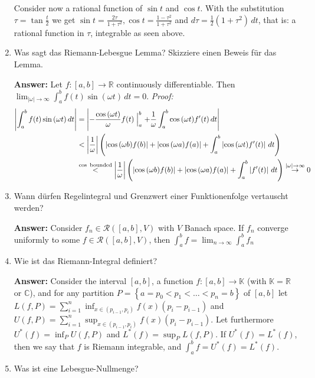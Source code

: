 \documentclass[11pt]{article}
\newcommand{\abs}[1]{\left|#1\right|}
\newcommand{\RR}[0]{\mathbb{R}}
\newcommand{\CC}[0]{\mathbb{C}}
\newcommand{\KK}[0]{\mathbb{K}}
\begin{document}
\begin{enumerate}
    Consider now a rational function of $\sin{t}$ and $\cos{t}$. With the substitution $\tau = \tan{\frac{t}{2}}$ we get $\sin{t} = \frac{2\tau}{1+ \tau^2}, \cos{t} = \frac{1-\tau^2}{1+\tau^2}$ and $d\tau = \frac{1}{2}(1+\tau^2)\,dt$, that is: a rational function in $\tau$, integrable as seen above.

    \item Was sagt das Riemann-Lebesgue Lemma? Skizziere einen Beweis für das Lemma.

    \textbf{Answer:} Let $f\colon [a, b] \to \RR$ continuously differentiable. Then $\lim_{\abs{\omega}\to\infty} \int_a^b f(t) \sin(\omega t) \,dt = 0$.
    \textit{Proof:} $$\begin{aligned}
        \abs{\int_a^b f(t) \sin{(\omega t)}\,dt} &= \abs{-\frac{\cos{(\omega t)}}{\omega}f(t)\Bigm|_a^b + \frac{1}{\omega} \int_a^b \cos{(\omega t)} f^\prime(t)\,dt} \\
        &< \abs{\frac{1}{\omega}} \left(\abs{\cos{(\omega b)} f(b)} + \abs{\cos{(\omega a)} f(a)} + \int_a^b \abs{\cos{(\omega t)} f^\prime(t)}\,dt \right)\\
        &\stackrel{\cos\text{ bounded}}{<} \abs{\frac{1}{\omega}} \left(\abs{\cos{(\omega b)} f(b)} + \abs{\cos{(\omega a)} f(a)} + \int_a^b \abs{f^\prime(t)}\,dt \right) \stackrel{\abs{\omega} \to \infty}{\to} 0
    \end{aligned}$$
    \item Wann dürfen Regelintegral und Grenzwert einer Funktionenfolge vertauscht werden?

    \textbf{Answer:} Consider $f_n \in \mathcal{R}([a, b], V)$ with $V$ Banach space. If $f_n$ converge uniformly to some $f\in \mathcal{R}([a, b], V)$, then $\int_a^b f = \lim_{n \to \infty} \int_a^b f_n$

    \item Wie ist das Riemann-Integral definiert?

    \textbf{Answer:} Consider the interval $[a, b]$, a function $f\colon [a, b] \to \KK$ (with $\KK = \RR$ or $\CC$), and for any partition $P = \left\{a = p_0 < p_1 < \dots < p_n = b\right\}$ of $[a, b]$ let $L(f, P) = \sum_{i = 1}^n \inf_{x \in (p_{i-1}, p_i)}f(x) (p_i - p_{i-1})$ and $U(f, P) = \sum_{i = 1}^n \sup_{x \in (p_{i-1}, p_i)}f(x) (p_i - p_{i-1})$. Let furthermore $U^*(f) = \inf_{P} U(f, P)$ and $L^*(f) = \sup_{P} L(f, P)$. If $U^*(f) = L^*(f)$, then we say that $f$ is Riemann integrable, and $\int_a^b f = U^*(f) = L^*(f)$.

    \item Was ist eine Lebesgue-Nullmenge?


\end{enumerate}
\end{document}
